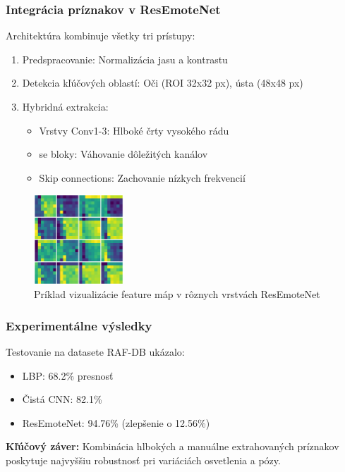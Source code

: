 \subsubsection{Integrácia príznakov v ResEmoteNet}
Architektúra kombinuje všetky tri prístupy:
\begin{enumerate}
    \item Predspracovanie: Normalizácia jasu a kontrastu
    \item Detekcia kľúčových oblastí: Oči (ROI 32x32 px), ústa (48x48 px)
    \item Hybridná extrakcia:
    \begin{itemize}
        \item Vrstvy Conv1-3: Hlboké črty vysokého rádu
        \item \gls{se} bloky: Váhovanie dôležitých kanálov
        \item Skip connections: Zachovanie nízkych frekvencií
    \end{itemize}
\end{enumerate}

\begin{figure}[htpb!]
\centering
\includegraphics[width=0.3\textwidth]{img/feature_maps.png}
\caption{Príklad vizualizácie feature máp v rôznych vrstvách ResEmoteNet}
\label{fig:feature_maps}
\end{figure}
\newpage
\subsubsection{Experimentálne výsledky}
Testovanie na datasete RAF-DB ukázalo:
\begin{itemize}
    \item LBP: 68.2\% presnosť
    \item Čistá CNN: 82.1\% 
    \item ResEmoteNet: 94.76\% (zlepšenie o 12.56\%)
\end{itemize}

\textbf{Kľúčový záver:} Kombinácia hlbokých a manuálne extrahovaných príznakov poskytuje najvyššiu robustnosť pri variáciách osvetlenia a pózy.

